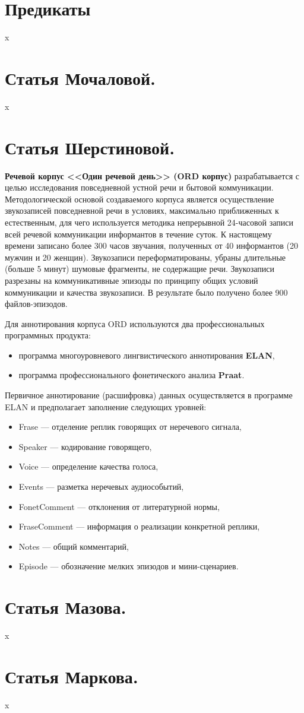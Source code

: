 \documentclass[12pt]{article}
\theoremstyle{definition}
\theoremstyle{remark}
\numberwithin{equation}{section}
\begin{document}
\section{Предикаты}
x
\section{Статья Мочаловой.}
x
\section{Статья Шерстиновой.}
\textbf{Речевой корпус <<Один речевой день>> (ORD корпус)} разрабатывается с целью исследования повседневной устной речи и бытовой коммуникации. Методологической основой создаваемого корпуса является осуществление звукозаписей повседневной речи в условиях, максимально приближенных к естественным, для чего используется методика непрерывной 24\nobreakdash-часовой записи всей речевой коммуникации информантов в течение суток. К настоящему времени записано более 300 часов звучания, полученных от 40 информантов (20 мужчин и 20 женщин). Звукозаписи переформатированы, убраны длительные (больше 5 минут) шумовые фрагменты, не содержащие речи. Звукозаписи разрезаны на коммуникативные эпизоды по принципу общих условий коммуникации и качества звукозаписи. В результате было получено более 900 файлов-эпизодов.

Для аннотирования корпуса ORD используются два профессиональных программных продукта:
\begin{itemize}
\item программа многоуровневого лингвистического аннотирования \textbf{ELAN},
\item программа профессионального фонетического анализа \textbf{Praat}.
\end{itemize}

Первичное аннотирование (расшифровка) данных осуществляется в программе ELAN и предполагает заполнение следующих уровней:
\begin{itemize}
\item Frase --- отделение реплик говорящих от неречевого сигнала,
\item Speaker --- кодирование говорящего,
\item Voice --- определение качества голоса,
\item Events --- разметка неречевых аудиособытий,
\item FonetComment --- отклонения от литературной нормы,
\item FraseComment --- информация о реализации конкретной реплики,
\item Notes --- общий комментарий,
\item Episode --- обозначение мелких эпизодов и мини\nobreakdash-сценариев.
\end{itemize}


\section{Статья Мазова.}
x
\section{Статья Маркова.}
x
\end{document}
